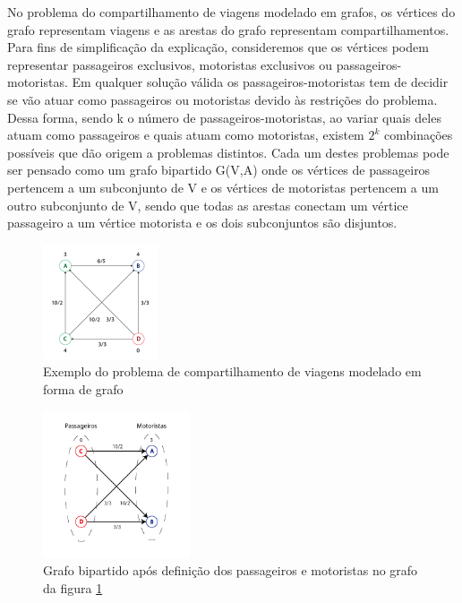 \documentclass{article}
\begin{document}
No problema do compartilhamento de viagens modelado em grafos, os vértices do grafo representam viagens e as arestas do grafo representam 
compartilhamentos. Para fins de simplificação da explicação, consideremos que os vértices podem representar passageiros exclusivos, motoristas exclusivos 
ou passageiros-motoristas. Em qualquer solução válida os passageiros-motoristas tem de decidir se vão
atuar como passageiros ou motoristas devido às restrições do problema. Dessa forma, sendo k o número de passageiros-motoristas, 
ao variar quais deles atuam como passageiros e quais atuam como motoristas, existem $ 2^k $ combinações possíveis que dão origem a problemas distintos. 
Cada um destes problemas pode ser pensado como um grafo bipartido G(V,A) onde os vértices de passageiros pertencem a um subconjunto de V e os vértices 
de motoristas pertencem a um outro subconjunto de V, sendo que todas as arestas conectam um vértice passageiro a um vértice motorista e os dois subconjuntos
são disjuntos.

\begin{figure}
  \center
  \includegraphics[width=128px]{graph.png}
  \caption{Exemplo do problema de compartilhamento de viagens modelado em forma de grafo}
  \label{fig:graph}
\end{figure}

\begin{figure}
  \center
  \includegraphics[width=164px]{bipartite_graph.png}
  \caption{Grafo bipartido após definição dos passageiros e motoristas no grafo da figura \ref{fig:graph}}
  \label{fig:bipartite_graph}
\end{figure}
\end{document}
